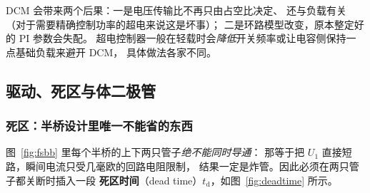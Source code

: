 \documentclass[cn,blue,11pt,device=normal]{elegantnote}
\begin{document}
DCM 会带来两个后果：一是电压传输比不再只由占空比决定、
还与负载有关（对于需要精确控制功率的超电来说这是坏事）；
二是环路模型改变，原本整定好的 PI 参数会失配。
超电控制器一般在轻载时会\emph{降低}开关频率或让电容侧保持一点基础负载来避开 DCM，
具体做法各家不同。

\subsection{驱动、死区与体二极管}

\subsubsection{死区：半桥设计里唯一不能省的东西}

图~\ref{fig:fsbb} 里每个半桥的上下两只管子\emph{绝不能同时导通}：
那等于把 $U_1$ 直接短路，瞬间电流只受几毫欧的回路电阻限制，
结果一定是炸管。因此必须在两只管子都关断时插入一段
\textbf{死区时间}（dead time）$t_{\mathrm{d}}$，如图~\ref{fig:deadtime} 所示。
\end{document}
